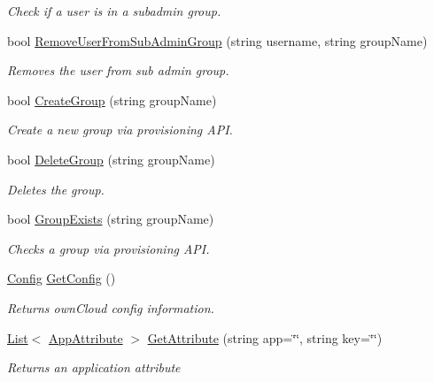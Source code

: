 \begin{DoxyCompactItemize}
\begin{DoxyCompactList}\small\item\em Check if a user is in a subadmin group. \end{DoxyCompactList}\item 
bool \hyperlink{classowncloudsharp_1_1_client_adc52bbdd5e176151e3ba3c51184872dc}{Remove\+User\+From\+Sub\+Admin\+Group} (string username, string group\+Name)
\begin{DoxyCompactList}\small\item\em Removes the user from sub admin group. \end{DoxyCompactList}\item 
bool \hyperlink{classowncloudsharp_1_1_client_ae3f6b18765fa47eed193eae4db94ae2c}{Create\+Group} (string group\+Name)
\begin{DoxyCompactList}\small\item\em Create a new group via provisioning A\+P\+I. \end{DoxyCompactList}\item 
bool \hyperlink{classowncloudsharp_1_1_client_a83390a9710020ecc7513dd03a23e192f}{Delete\+Group} (string group\+Name)
\begin{DoxyCompactList}\small\item\em Deletes the group. \end{DoxyCompactList}\item 
bool \hyperlink{classowncloudsharp_1_1_client_a0eb9c35f345906e16175605b0cc08ade}{Group\+Exists} (string group\+Name)
\begin{DoxyCompactList}\small\item\em Checks a group via provisioning A\+P\+I. \end{DoxyCompactList}\item 
\hyperlink{classowncloudsharp_1_1_types_1_1_config}{Config} \hyperlink{classowncloudsharp_1_1_client_a6c228561d4c74c310b898ad8bd60095b}{Get\+Config} ()
\begin{DoxyCompactList}\small\item\em Returns own\+Cloud config information. \end{DoxyCompactList}\item 
\hyperlink{classowncloudsharp_1_1_client_a914c144ebbe207958829523f7eda3609}{List}$<$ \hyperlink{classowncloudsharp_1_1_types_1_1_app_attribute}{App\+Attribute} $>$ \hyperlink{classowncloudsharp_1_1_client_a8f843f60b178973e988c0edabef26c49}{Get\+Attribute} (string app=\char`\"{}\char`\"{}, string key=\char`\"{}\char`\"{})
\begin{DoxyCompactList}\small\item\em Returns an application attribute \end{DoxyCompactList}\item 

\end{DoxyCompactItemize}
